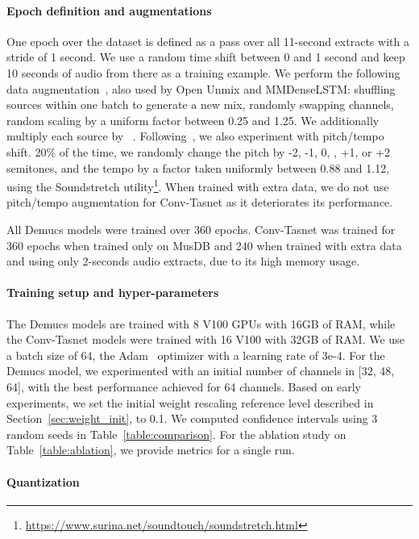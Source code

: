 \paragraph{Epoch definition and augmentations}
One epoch over the dataset is defined as a pass over all 11-second extracts with a stride of 1 second. We use a random time shift between
0 and 1 second and keep 10 seconds of audio from there as a training example. We perform the following data augmentation~\citep{uhlich2017improving}, also used by Open Unmix and MMDenseLSTM: shuffling sources within one batch to generate a new mix, randomly swapping channels, random scaling by a uniform factor between 0.25 and 1.25. We additionally
multiply each source by ~\citep{nachmani2019unsupervised}. 
Following~\citep{cohen2019improving}, we also experiment with pitch/tempo shift. 20\% of the time, we randomly change the pitch by
-2, -1, 0, , +1, or +2 semitones, and the tempo by a factor taken uniformly between 0.88 and 1.12, using the Soundstretch utility\footnote{\url{https://www.surina.net/soundtouch/soundstretch.html}}.
When trained with extra data, we do not use pitch/tempo augmentation for Conv-Tasnet as it deteriorates its performance.

All Demucs models were trained over 360 epochs. Conv-Tasnet was trained for 360 epochs when trained only on MusDB and 240 when trained with extra data and using only 2-seconds audio extracts, due to its high memory usage.


\paragraph{Training setup and hyper-parameters}
The Demucs models are trained with 8 V100 GPUs with 16GB of RAM, while the Conv-Tasnet
models were trained with 16 V100 with 32GB of RAM. We use a batch size of 64, the Adam~\citep{adam} optimizer with a learning rate of 3e-4. 
For the Demucs model, we experimented with an initial number of channels in [32, 48, 64], with the best performance achieved for 64 channels.
Based on early experiments, we set the initial weight rescaling reference level described in Section~\ref{sec:weight_init}, to 0.1.
We computed confidence intervals using 3 random seeds in Table~\ref{table:comparison}.
For the ablation study on Table~\ref{table:ablation}, we provide metrics for a single run. 

\paragraph{Quantization}

